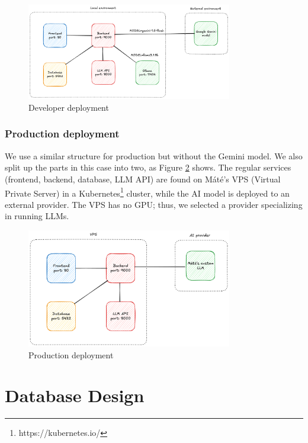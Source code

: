 \begin{figure}[!h]
    \centering
    \includegraphics[width=0.8\textwidth, keepaspectratio]{figures/dev-deployment.png}
    \caption{Developer deployment}
    \label{fig:dev-deployment}
\end{figure}

\subsubsection{Production deployment}

We use a similar structure for production but without the Gemini model. We also split up the parts in this case into two, as Figure \ref{fig:production-deployment} shows. The regular services (frontend, backend, database, LLM API) are found on Máté's VPS (Virtual Private Server) in a Kubernetes\footnote{https://kubernetes.io/} cluster, while the AI model is deployed to an external provider. The VPS has no GPU; thus, we selected a provider specializing in running LLMs.

\begin{figure}[!h]
    \centering
    \includegraphics[width=0.8\textwidth, keepaspectratio]{figures/production-deployment.png}
    \caption{Production deployment}
    \label{fig:production-deployment}
\end{figure}

\section{Database Design}

